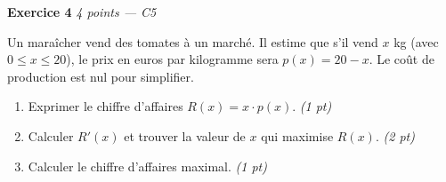 
\bigskip

\textbf{Exercice 4} \hfill \textit{4 points — C5}

Un maraîcher vend des tomates à un marché. Il estime que s'il vend $x$ kg (avec $0 \leqslant x \leqslant 20$), le prix en euros par kilogramme sera $p(x) = 20 - x$. Le coût de production est nul pour simplifier.

\begin{enumerate}
  \item Exprimer le chiffre d'affaires $R(x) = x \cdot p(x)$. \hfill \textit{(1 pt)}
  \item Calculer $R'(x)$ et trouver la valeur de $x$ qui maximise $R(x)$. \hfill \textit{(2 pt)}
  \item Calculer le chiffre d'affaires maximal. \hfill \textit{(1 pt)}
\end{enumerate}

